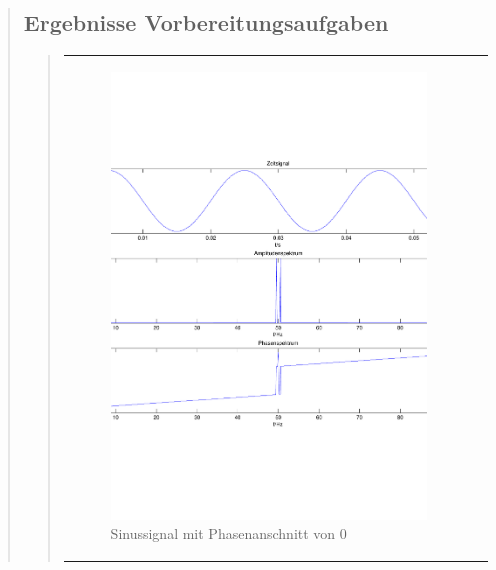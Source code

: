 \begin{quote}
    \subsection{Ergebnisse Vorbereitungsaufgaben}
    \begin{quote}
            \begin{center}
            \begin{tabular}{ll}

            \hspace{-4em}
                \begin{minipage}{0.6\textwidth}

                    \begin{figure}[H]
                        \label{fig:}
                        \includegraphics[scale=0.3]{./Bilder/Phasenanschnitt08pi.pdf} %
                        \caption{Sinussignal mit Phasenanschnitt von $0$}
                    \end{figure}


\end{minipage}
\end{tabular}
\end{center}
\end{quote}
\end{quote}
